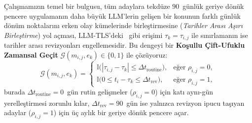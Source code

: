 ﻿\documentclass[journal]{IEEEtran}
\begin{document}
\c{C}al{\i}\c{s}mam{\i}z{\i}n temel bir bulgusu, t\"{u}m adaylara tekd\"{u}ze $90$~g\"{u}nl\"{u}k geriye d\"{o}n\"{u}k pencere uygulaman{\i}n daha b\"{u}y\"{u}k LLM'lerin geli\c{s}en bir konunun farkl{\i} g\"{u}nl\"{u}k d\"{o}n\"{u}m noktalar{\i}n{\i} erken olay k\"{u}melerinde birle\c{s}tirmesine (\textit{Tarihler Aras{\i} A\c{s}{\i}r{\i} Birle\c{s}tirme}) yol a\c{c}mas{\i}, LLM-TLS'deki~\cite{hu2024moments} gibi eri\c{s}imi $\tau_k = \tau_{i,j}$ ile s{\i}n{\i}rlaman{\i}n ise tarihler aras{\i} revizyonlar{\i} engellemesidir. Bu dengeyi bir \textbf{Ko\c{s}ullu \c{C}ift-Ufuklu Zamansal Ge\c{c}it} $\mathcal{G}(m_{i,j}, e_k) \in \{0, 1\}$ ile \c{c}\"{o}z\"{u}yoruz:
\begin{equation}
\mathcal{G}(m_{i,j}, e_k) = \begin{cases}
\mathbb{I}\big( |\tau_{i,j} - \tau_k| \le \Delta t_{\text{routine}} \big), & \text{e\u{g}er } \rho_{i,j} = 0, \\[3pt]
\mathbb{I}\big( 0 \le t_i - \tau_k \le \Delta t_{\text{rev}} \big), & \text{e\u{g}er } \rho_{i,j} = 1,
\end{cases}
\label{eq:temporal_gate}
\end{equation}
burada $\Delta t_{\text{routine}} = 0$~g\"{u}n rutin geli\c{s}meler ($\rho_{i,j} = 0$) i\c{c}in kat{\i} ayn{\i}-g\"{u}n yerelle\c{s}tirmesi zorunlu k{\i}lar, $\Delta t_{\text{rev}} = 90$~g\"{u}n ise yaln{\i}zca revizyon ipucu ta\c{s}{\i}yan adaylar ($\rho_{i,j} = 1$) i\c{c}in \"{u}\c{c} ayl{\i}k bir geriye d\"{o}n\"{u}k pencere a\c{c}ar.
\end{document}

